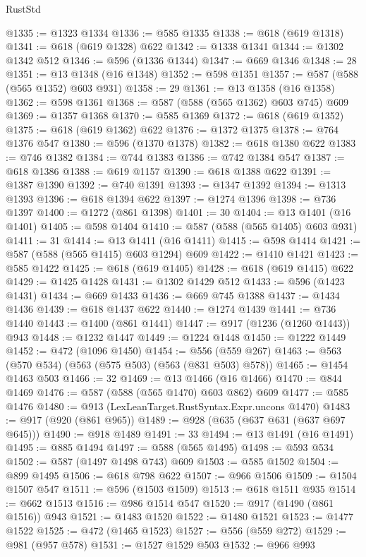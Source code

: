 \begin{lexlean}{RustStd}
\begin{coremodule}
@1335 := @1323 @1334
@1336 := @585 @1335
@1338 := @618 (@619 @1318)
@1341 := @618 (@619 @1328) @622
@1342 := @1338 @1341
@1344 := @1302 @1342 @512
@1346 := @596 (@1336 @1344)
@1347 := @669 @1346
@1348 := 28
@1351 := @13 @1348 (@16 @1348)
@1352 := @598 @1351
@1357 := @587 (@588 (@565 @1352) @603 @931)
@1358 := 29
@1361 := @13 @1358 (@16 @1358)
@1362 := @598 @1361
@1368 := @587 (@588 (@565 @1362) @603 @745) @609
@1369 := @1357 @1368
@1370 := @585 @1369
@1372 := @618 (@619 @1352)
@1375 := @618 (@619 @1362) @622
@1376 := @1372 @1375
@1378 := @764 @1376 @547
@1380 := @596 (@1370 @1378)
@1382 := @618 @1380 @622
@1383 := @746 @1382
@1384 := @744 @1383
@1386 := @742 @1384 @547
@1387 := @618 @1386
@1388 := @619 @1157
@1390 := @618 @1388 @622
@1391 := @1387 @1390
@1392 := @740 @1391
@1393 := @1347 @1392
@1394 := @1313 @1393
@1396 := @618 @1394 @622
@1397 := @1274 @1396
@1398 := @736 @1397
@1400 := @1272 (@861 @1398)
@1401 := 30
@1404 := @13 @1401 (@16 @1401)
@1405 := @598 @1404
@1410 := @587 (@588 (@565 @1405) @603 @931)
@1411 := 31
@1414 := @13 @1411 (@16 @1411)
@1415 := @598 @1414
@1421 := @587 (@588 (@565 @1415) @603 @1294) @609
@1422 := @1410 @1421
@1423 := @585 @1422
@1425 := @618 (@619 @1405)
@1428 := @618 (@619 @1415) @622
@1429 := @1425 @1428
@1431 := @1302 @1429 @512
@1433 := @596 (@1423 @1431)
@1434 := @669 @1433
@1436 := @669 @745 @1388
@1437 := @1434 @1436
@1439 := @618 @1437 @622
@1440 := @1274 @1439
@1441 := @736 @1440
@1443 := @1400 (@861 @1441)
@1447 := @917 (@1236 (@1260 @1443)) @943
@1448 := @1232 @1447
@1449 := @1224 @1448
@1450 := @1222 @1449
@1452 := @472 (@1096 @1450)
@1454 := @556 (@559 @267)
@1463 := @563 (@570 @534) (@563 (@575 @503) (@563 (@831 @503) @578))
@1465 := @1454 @1463 @503
@1466 := 32
@1469 := @13 @1466 (@16 @1466)
@1470 := @844 @1469
@1476 := @587 (@588 (@565 @1470) @603 @862) @609
@1477 := @585 @1476
@1480 := @913 (LexLeanTarget.RustSyntax.Expr.uncons @1470)
@1483 := @917 (@920 (@861 @965))
@1489 := @928 (@635 (@637 @631 (@637 @697 @645)))
@1490 := @918 @1489
@1491 := 33
@1494 := @13 @1491 (@16 @1491)
@1495 := @885 @1494
@1497 := @588 (@565 @1495)
@1498 := @593 @534
@1502 := @587 (@1497 @1498 @743) @609
@1503 := @585 @1502
@1504 := @899 @1495
@1506 := @618 @798 @622
@1507 := @966 @1506
@1509 := @1504 @1507 @547
@1511 := @596 (@1503 @1509)
@1513 := @618 @1511 @935
@1514 := @662 @1513
@1516 := @986 @1514 @547
@1520 := @917 (@1490 (@861 @1516)) @943
@1521 := @1483 @1520
@1522 := @1480 @1521
@1523 := @1477 @1522
@1525 := @472 (@1465 @1523)
@1527 := @556 (@559 @272)
@1529 := @981 (@957 @578)
@1531 := @1527 @1529 @503
@1532 := @966 @993

\end{coremodule}
\end{lexlean}
